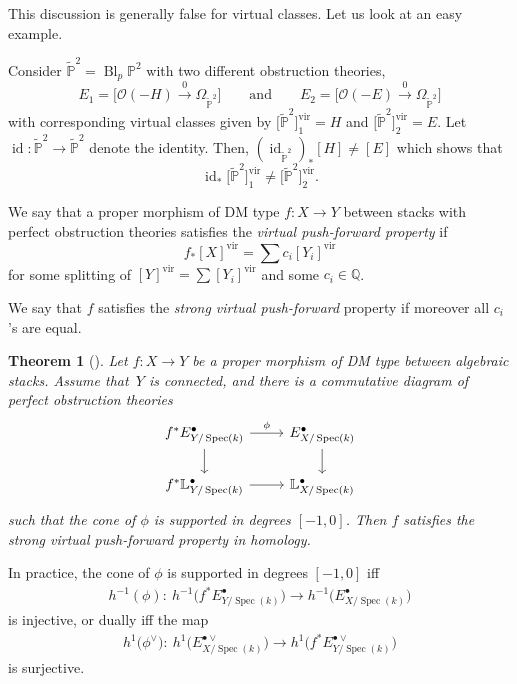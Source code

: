 \documentclass[pdftex]{sigma}
\numberwithin{equation}{section}
\newtheorem{Theorem}{Theorem}[section]
\newcommand{\vv}{\mathrm{vir}}
\newcommand{\Spec}{\operatorname{Spec}}
\newcommand{\PP}{\mathbb P}
\theoremstyle{plain}
\theoremstyle{definition}
\theoremstyle{remark}
\begin{document}
This discussion is generally false for virtual classes. Let us look at an easy example.
\begin{Example} Consider $\tilde{\mathbb P}^2=\operatorname{Bl}_p\PP^2$ with two different obstruction theories,
\begin{equation*}
 E_1=\big[\mathcal O(-H)\xrightarrow{0}\Omega_{\tilde{\mathbb P}^2}\big] \qquad\text{and}\qquad E_2=\big[\mathcal O(-E)\xrightarrow{0}\Omega_{\tilde{\mathbb P}^2}\big]
\end{equation*}
with corresponding virtual classes given by $\big[\tilde{\mathbb P}^2\big]^{\vv}_1=H$ and $\big[\tilde{\mathbb P}^2\big]^{\vv}_2=E$. Let $\operatorname{id}\colon \tilde{\mathbb P}^2\to \tilde{\mathbb P}^2$ denote the identity. Then, $(\operatorname{id}_{\tilde{\mathbb P}^2})_*[H]\neq[E]$ which shows that
\[\operatorname{id}_* \big[\tilde{\mathbb P}^2\big]^{\vv}_1\neq \big[\tilde{\mathbb P}^2\big]^{\vv}_2.
\]
\end{Example}
\begin{Definition}\label{defvpf} We say that a proper morphism of DM type $f\colon X\to Y$ between stacks with perfect obstruction theories satisfies the \emph{virtual push-forward property} if
 \[f_*[X]^{\vv}=\sum c_i[Y_i]^{\vv}
 \]
 for some splitting of $[Y]^{\vv}=\sum[Y_i]^{\vv}$ and some $c_i\in\mathbb Q$.

 We say that $f$ satisfies the \emph{strong virtual push-forward} property if moreover all $c_i$'s are equal.
\end{Definition}
\begin{Theorem}[\cite{vir-push}] \label{vpf1} Let $f\colon X\to Y$ be a proper morphism of DM type between algebraic stacks. Assume that~$Y$ is connected, and there is a commutative diagram of perfect obstruction theories
 \[
 \begin{tikzcd}
 f^*E^\bullet_{Y/\Spec(k)}\ar[r,"\phi"]\ar[d] & E^\bullet_{X/\Spec(k)} \ar[d] \\
 f^*\mathbb L^\bullet_{Y/\Spec(k)}\ar[r] & \mathbb L^\bullet_{X/\Spec(k)}
 \end{tikzcd}
 \]
such that the cone of $\phi$ is supported in degrees $[-1,0]$. Then $f$ satisfies the strong virtual push-forward property in homology.
\end{Theorem}
In practice, the cone of $\phi$ is supported in degrees $[-1,0]$ iff
\begin{gather*}h^{-1}(\phi)\colon \ h^{-1}\big(f^*E^\bullet_{Y/\Spec(k)}\big)\to h^{-1}\big(E^\bullet_{X/\Spec(k)}\big)\end{gather*} is injective, or dually iff the map \begin{gather*}h^{1}\big(\phi^\vee\big)\colon \ h^{1}\big(E^{\bullet\vee}_{X/\Spec(k)}\big) \to h^{1}\big(f^*E^{\bullet\vee}_{Y/\Spec(k)}\big)\end{gather*} is surjective.
\end{document}
